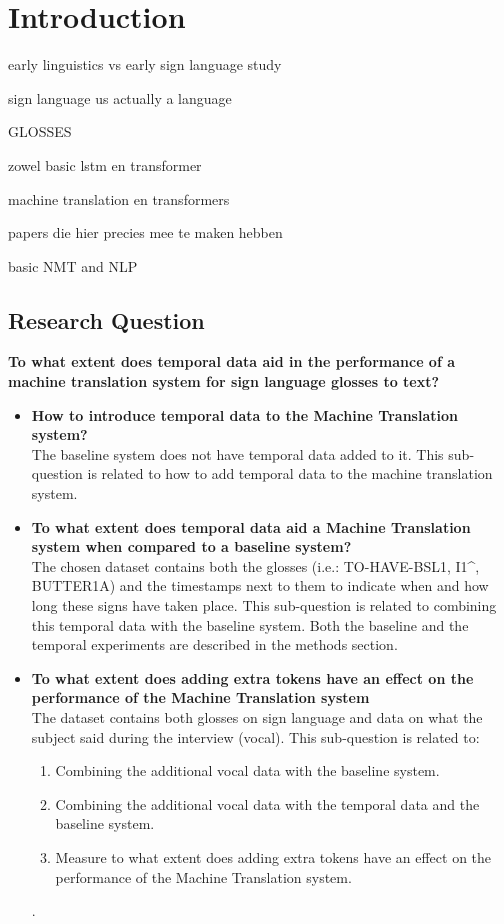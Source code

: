 \section{Introduction}

early linguistics vs early sign language study

\cite{stokoe2005sign}
sign language us actually a language

GLOSSES

zowel basic lstm en transformer

machine translation en transformers \cite{vaswani2017attention}

papers die hier precies mee te maken hebben
\cite{garcia2016factored}

basic NMT and NLP

\subsection{Research Question}

\textbf{To what extent does temporal data aid in the performance of a machine translation system for sign language glosses to text?}

\begin{itemize}
    \item \textbf{How to introduce temporal data to the Machine Translation system?} \\
    The baseline system does not have temporal data added to it. This sub-question is related to how to add temporal data to the machine translation system.
    \item \textbf{To what extent does temporal data aid a Machine Translation system when compared to a baseline system?} \\
    The chosen dataset \cite{dgscorpus_3} contains both the glosses (i.e.: TO-HAVE-BSL1, I1\textasciicircum, BUTTER1A) and the timestamps next to them to indicate when and how long these signs have taken place. This sub-question is related to combining this temporal data with the baseline system. Both the baseline and the temporal experiments are described in the methods section.
    \item \textbf{To what extent does adding extra tokens have an effect on the performance of the Machine Translation system} \\
    The dataset contains both glosses on sign language and data on what the subject said during the interview (vocal). This sub-question is related to:
    \begin{enumerate}
        \item Combining the additional vocal data with the baseline system.
        \item Combining the additional vocal data with the temporal data and the baseline system.
        \item Measure to what extent does adding extra tokens have an effect on the performance of the Machine Translation system.
    \end{enumerate}.
\end{itemize}

